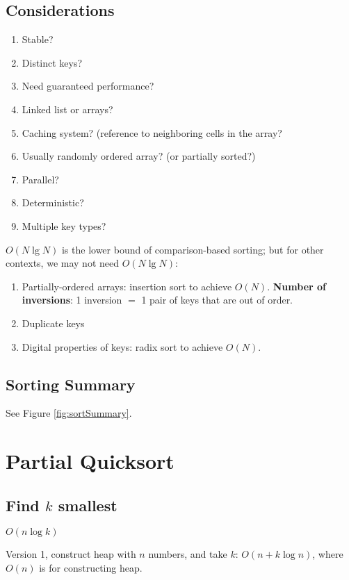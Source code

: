 \subsection{Considerations}
\begin{enumerate}
\item Stable?
\item Distinct keys?
\item Need guaranteed performance?
\item Linked list or arrays?
\item Caching system? (reference to neighboring cells in the array? 
\item Usually randomly ordered array?
(or partially sorted?)\item Parallel?
\item Deterministic?
\item Multiple key types?
\end{enumerate}

$O(N\lg N)$ is the lower bound of comparison-based sorting; but for other
contexts, we may not need $O(N \lg N)$:
\begin{enumerate}
\item Partially-ordered arrays: insertion sort to achieve $O(N)$. \textbf{Number of inversions}: 1 inversion $=$ 1 pair of keys that are out
of order.
\item Duplicate keys
\item Digital properties of keys: radix sort to achieve $O(N)$.
\end{enumerate}

\subsection{Sorting Summary}
See Figure \ref{fig:sortSummary}.
\begin{figure*}[h]
\centering
{}
\caption{Sort summary}
\label{fig:sortSummary} 
\end{figure*}

\section{Partial Quicksort}
\subsection{Find $k$ smallest}
 $O(n \log k)$

Version 1, construct heap with $n$ numbers, and take $k$: $O(n+k\log n)$, where $O(n)$ is for constructing heap. 

